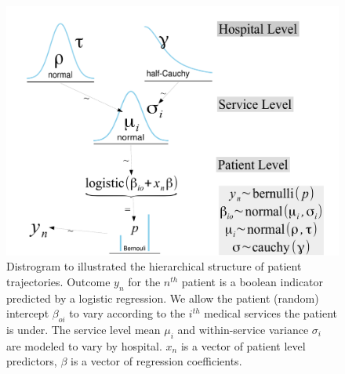\documentclass[11pt,notitlepage]{article}
\begin{document}
\begin{figure} %
 \vspace{-15pt}
 \includegraphics[scale=0.3]{Figures/Distrogram.pdf} 
  \vspace{-10pt}
 \caption{\footnotesize Distrogram to illustrated the hierarchical structure of patient trajectories. Outcome $y_n$ for the $n^{th}$ patient is a boolean indicator predicted by a logistic regression. We allow the patient (random) intercept $\beta_{oi}$ to vary according to the $i^{th}$ medical services the patient is under. The service level mean $\mu_i$ and within-service variance $\sigma_i$ are modeled to vary by hospital. $x_n$ is a vector of patient level predictors, $\beta$ is a vector of regression coefficients.}
 \vspace{-10pt}
 \label{fig:Distrogram}
\end{figure} 
\end{document}
